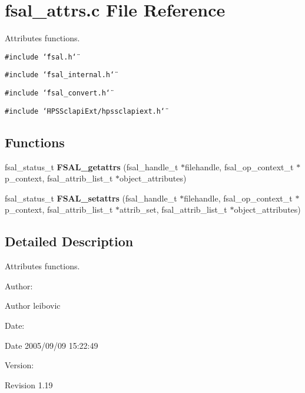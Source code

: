 \section{fsal\_\-attrs.c File Reference}
\label{fsal__attrs_8c}
Attributes functions. 

{\tt \#include \char`\"{}fsal.h\char`\"{}}\par
{\tt \#include \char`\"{}fsal\_\-internal.h\char`\"{}}\par
{\tt \#include \char`\"{}fsal\_\-convert.h\char`\"{}}\par
{\tt \#include \char`\"{}HPSSclapi\-Ext/hpssclapiext.h\char`\"{}}\par
\subsection*{Functions}
\begin{CompactItemize}
\item 
fsal\_\-status\_\-t {\bf FSAL\_\-getattrs} (fsal\_\-handle\_\-t $\ast$filehandle, fsal\_\-op\_\-context\_\-t $\ast$p\_\-context, fsal\_\-attrib\_\-list\_\-t $\ast$object\_\-attributes)
\item 
fsal\_\-status\_\-t {\bf FSAL\_\-setattrs} (fsal\_\-handle\_\-t $\ast$filehandle, fsal\_\-op\_\-context\_\-t $\ast$p\_\-context, fsal\_\-attrib\_\-list\_\-t $\ast$attrib\_\-set, fsal\_\-attrib\_\-list\_\-t $\ast$object\_\-attributes)
\end{CompactItemize}


\subsection{Detailed Description}
Attributes functions. 

\begin{Desc}
\item[Author:]\begin{Desc}
\item[Author]leibovic \end{Desc}
\end{Desc}
\begin{Desc}
\item[Date:]\begin{Desc}
\item[Date]2005/09/09 15:22:49 \end{Desc}
\end{Desc}
\begin{Desc}
\item[Version:]\begin{Desc}
\item[Revision]1.19 \end{Desc}
\end{Desc}


